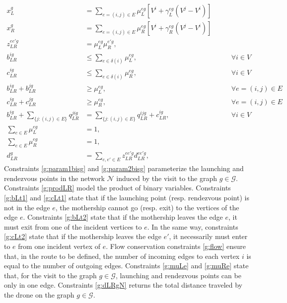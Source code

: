 \begin{align}
    x_L^g & = \sum_{e=(i, j)\in E} \mu_{L}^{eg}\left[V^i + \gamma_{L}^{eg}(V^j - V^i)\right]\label{g:param1bisg}\\
    x_R^g & = \sum_{e=(i, j)\in E} \mu_{R}^{eg}\left[ V^i + \gamma_{R}^{eg}(V^j - V^i)\right]\label{g:param2bisg}\\
    z_{LR}^{ee'g} & = \mu_{L}^{eg}\mu_{R}^{e'g},\label{g:prodLR}\\
    b_{LR}^{ig} & \leq \sum_{e\in\delta(i)} \mu_{L}^{eg}, \label{g:bLt1}&\qquad \forall i\in V \\
    c_{LR}^{ig} & \leq \sum_{e\in\delta(i)} \mu_{R}^{eg}, \label{g:cLt1}&\qquad \forall i\in V\\
    b_{LR}^{ig} + b_{LR}^{jg} & \geq \mu_L^{eg}, &\qquad \forall e=(i, j)\in E\label{g:bLt2}\\
    c_{LR}^{ig} + c_{LR}^{jg} & \geq \mu_R^{eg}, &\qquad \forall e=(i, j)\in E\label{g:cLt2}\\
    b_{LR}^{ig} + \sum_{\{j:(i, j)\in E\}} q_{LR}^{jig} & = \sum_{\{j:(i, j)\in E\}} q_{LR}^{ijg} +  c_{LR}^{ig}, \label{g:flow}&\qquad \forall i \in V\\
    \sum_{e\in E} \mu_{L}^{eg} & = 1,  \label{g:muLe} \\
    \sum_{e\in E} \mu_{R}^{eg} & = 1, \label{g:muRe}\\
    d_{LR}^g & = \sum_{e, e'\in E} z_{LR}^{ee'g} d_{LR}^{ee'g}, \label{g:dLRgN}
\end{align}
\noindent
Constraints \eqref{g:param1bisg} and \eqref{g:param2bisg} parameterize the launching and rendezvous points in the network $\mathcal N$ induced by the visit to the graph  $g\in \mathcal{G}$. Constraints \eqref{g:prodLR} model the product of binary variables. Constraints \eqref{g:bLt1} and \eqref{g:cLt1} state that if the launching point (resp. rendezvous point) is not in the edge $e$, the mothership cannot go (resp. exit) to the vertices of the edge $e$. Constraints \eqref{g:bLt2} state that if the mothership leaves the edge $e$, it must exit from one of the incident vertices to $e$. In the same way, constraints \eqref{g:cLt2} state that if the mothership leaves the edge $e'$, it necessarily must enter to $e$ from one incident vertex of $e$. Flow conservation constraints \eqref{g:flow} ensure that, in the route to be defined, the number of incoming edges to each vertex $i$ is equal to the number of outgoing edges. Constraints \eqref{g:muLe} and \eqref{g:muRe} state that, for the visit to the graph  $g\in \mathcal{G}$, launching and rendezvous points can be only in one edge. Constraints \eqref{g:dLRgN} returns the total distance traveled by the drone on the graph  $g\in \mathcal{G}$.

